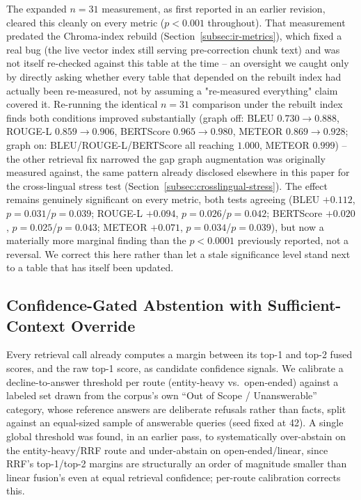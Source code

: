 \documentclass[a4paper,twoside]{article}
\begin{document}
The expanded $n=31$ measurement, as first reported in an earlier revision, cleared this cleanly on every metric ($p<0.001$ throughout). That measurement predated the Chroma-index rebuild (Section~\ref{subsec:ir-metrics}), which fixed a real bug (the live vector index still serving pre-correction chunk text) and was not itself re-checked against this table at the time -- an oversight we caught only by directly asking whether every table that depended on the rebuilt index had actually been re-measured, not by assuming a "re-measured everything" claim covered it. Re-running the identical $n=31$ comparison under the rebuilt index finds both conditions improved substantially (graph off: BLEU $0.730\to0.888$, ROUGE-L $0.859\to0.906$, BERTScore $0.965\to0.980$, METEOR $0.869\to0.928$; graph on: BLEU/ROUGE-L/BERTScore all reaching $1.000$, METEOR $0.999$) -- the other retrieval fix narrowed the gap graph augmentation was originally measured against, the same pattern already disclosed elsewhere in this paper for the cross-lingual stress test (Section~\ref{subsec:crosslingual-stress}). The effect remains genuinely significant on every metric, both tests agreeing (BLEU $+0.112$, $p=0.031$/$p=0.039$; ROUGE-L $+0.094$, $p=0.026$/$p=0.042$; BERTScore $+0.020$, $p=0.025$/$p=0.043$; METEOR $+0.071$, $p=0.034$/$p=0.039$), but now a materially more marginal finding than the $p<0.0001$ previously reported, not a reversal. We correct this here rather than let a stale significance level stand next to a table that has itself been updated.

\subsection{Confidence-Gated Abstention with Sufficient-Context Override}
\label{subsec:abstention}

Every retrieval call already computes a margin between its top-1 and top-2 fused scores, and the raw top-1 score, as candidate confidence signals. We calibrate a decline-to-answer threshold per route (entity-heavy vs.\ open-ended) against a labeled set drawn from the corpus's own ``Out of Scope / Unanswerable'' category, whose reference answers are deliberate refusals rather than facts, split against an equal-sized sample of answerable queries (seed fixed at 42). A single global threshold was found, in an earlier pass, to systematically over-abstain on the entity-heavy/RRF route and under-abstain on open-ended/linear, since RRF's top-1/top-2 margins are structurally an order of magnitude smaller than linear fusion's even at equal retrieval confidence; per-route calibration corrects this.
\end{document}
